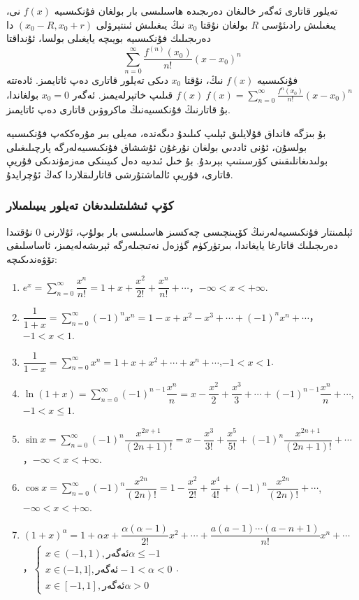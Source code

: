 \begin{MyDefinition}{تەيلور قاتارى}{}
	ئەگەر خالىغان دەرىجىدە ھاسىلىسى بار بولغان فۇنكىسىيە
$f(x)$
نى، يىغىلىش رادىئۇسى 
$R$
بولغان نۇقتا
$x_0$
نىڭ يىغىلىش ئىنتېرۋلى 
$(x_0-R,x_0+r)$
دا دەرىجىلىك فۇنكىسىيە بويىچە يايغىلى بولسا، ئۇنداقتا
$$
\sum\limits_{n=0}^\infty \frac{f^{(n)}(x_0)}{n!}(x-x_0)^n
$$
فۇنكىسىيە
$f(x)$
نىڭ، نۇقتا 
$x_0$
دىكى تەيلور قاتارى دەپ ئاتايمىز. ئادەتتە
$f(x) ~ f(x) =  \sum\limits_{n=0}^\infty \frac{f^{n}(x_0)}{n!}(x-x_0)^n$
قىلىپ خاتېرلەيمىز. ئەگەر 
$x_0 = 0$
بولغاندا، بۇ قاتارنىڭ فۇنكسىيەنىڭ ماكروۋىن قاتارى دەپ ئاتايمىز.
\end{MyDefinition}
بۇ بىزگە قانداق قۇلايلىق ئېلىپ كىلىدۇ دىگەندە، مەيلى بىر مۇرەككەپ فۇنكىسىيە بولسۇن، ئۇنى ئاددىي بولغان نۇرغۇن ئۇششاق فۇنكىسىيەلەرگە پارچىلىغىلى بولىدىغانلىقىنى كۆرسىتىپ بېرىدۇ. بۇ خىل ئىدىيە دەل كىيىنكى مەزمۇندىكى فۇريې قاتارى، فۇريې ئالماشتۇرشى قاتارلىقلاردا كەڭ ئۇچرايدۇ.
\subsubsection{كۆپ ئىشلىتىلىدىغان تەيلور يىيىلمىلار}
ئېلمىنتار فۇنكىسىيەلەرنىڭ كۆپىنچىسى چەكسىز ھاسىلىسى بار بولۇپ، ئۇلارنى 0 نۇقتىدا دەرىجىلىك قاتارغا يايغاندا، بىرتۈركۈم گۈزەل نەتىجىلەرگە ئېرىشەلەيمىز، ئاساسلىقى تۆۋەندىكىچە:
\begin{english}
\begin{enumerate}
	\item $e^x=\sum\limits_{n=0}^\infty\dfrac{x^n}{n!}=1+x+\dfrac{x^2}{2!}+\dfrac{x^n}{n!}+\cdots$，$-\infty<x<+\infty$.
	\item $\dfrac{1}{1+x}=\sum\limits_{n=0}^\infty(-1)^nx^n=1-x+x^2-x^3+\cdots+(-1)^nx^n+\cdots$，$-1<x<1$.
	\item $\dfrac{1}{1-x}=\sum\limits_{n=0}^\infty x^n=1+x+x^2+\cdots+x^n+\cdots$,$-1<x<1$.
	\item $\ln(1+x)=\sum\limits_{n=0}^\infty(-1)^{n-1}\dfrac{x^n}{n}=x-\dfrac{x^2}{2}+\dfrac{x^3}{3}+\cdots+(-1)^{n-1}\dfrac{x^n}{n}+\cdots$,$-1<x\leqslant1$.
	\item $\sin x=\sum\limits_{n=0}^\infty(-1)^n\dfrac{x^{2x+1}}{(2n+1)!}=x-\dfrac{x^3}{3!}+\dfrac{x^5}{5!}+(-1)^n\dfrac{x^{2n+1}}{(2n+1)!}+\cdots$，$-\infty<x<+\infty$.
	\item $\cos x=\sum\limits_{n=0}^\infty(-1)^n\dfrac{x^{2n}}{(2n)!}=1-\dfrac{x^2}{2!}+\dfrac{x^4}{4!}+(-1)^n\dfrac{x^{2n}}{(2n)!}+\cdots$,$-\infty<x<+\infty$.
	\item $(1+x)^\alpha=1+\alpha x+\dfrac{\alpha(\alpha-1)}{2!}x^2+\cdots+\dfrac{a(a-1)\cdots(a-n+1)}{n!}x^n+\cdots$，$\left\{\begin{array}{l}
		x\in(-1,1),\text{ئەگەر}\alpha\leqslant-1 \\
		x\in(-1,1],\text{ئەگەر}-1<\alpha<0 \\
		x\in[-1,1],\text{ئەگەر}\alpha>0
	\end{array}\right.$.
\end{enumerate}
\end{english}

